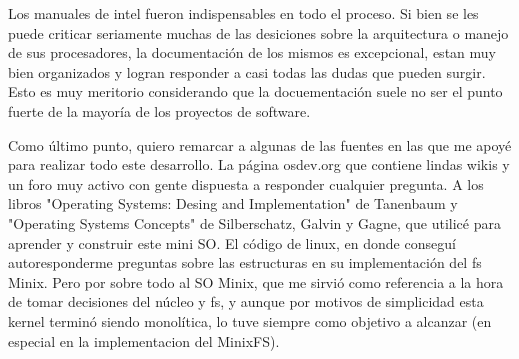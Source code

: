 Los manuales de intel fueron indispensables en todo el proceso. Si bien se les
puede criticar seriamente muchas de las desiciones sobre la arquitectura o
manejo de sus procesadores, la documentación de
los mismos es excepcional, estan muy bien organizados y logran responder a casi
todas las dudas que pueden surgir. Esto es muy meritorio considerando que la
docuementación suele no ser el punto fuerte de la mayoría de los proyectos de
software.

Como último punto, quiero remarcar a algunas de las fuentes en las que me apoyé
para realizar todo este desarrollo. La página osdev.org que contiene lindas
wikis y un foro muy activo con gente dispuesta a responder cualquier pregunta.
A los libros "Operating Systems: Desing and Implementation" de Tanenbaum y
"Operating Systems Concepts" de Silberschatz, Galvin y Gagne, que utilicé
para aprender y construir este mini SO. El código de linux, en donde conseguí
autoresponderme preguntas sobre las estructuras en su implementación del fs
Minix. Pero por sobre todo al SO Minix, que me sirvió como referencia a la hora
de tomar decisiones del núcleo y fs, y aunque por motivos de simplicidad esta
kernel terminó siendo monolítica, lo tuve siempre como objetivo a alcanzar (en
especial en la implementacion del MinixFS).
